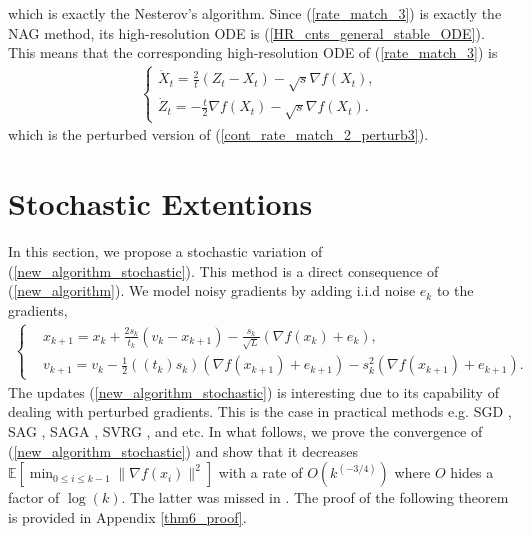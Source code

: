 \documentclass{article}
\theoremstyle{plain}
\theoremstyle{definition}
\theoremstyle{remark}
\begin{document}
which is exactly the Nesterov's algorithm. Since (\ref{rate_match_3}) is exactly the NAG method, its high-resolution ODE is (\ref{HR_cnts_general_stable_ODE}). This means that the corresponding high-resolution ODE of (\ref{rate_match_3}) is 
\begin{align}\label{cont_rate_match_2_perturb4}
    \left\{\begin{array}{l}
         \dot X_t = \frac{2}{t}(Z_t-X_t)-\sqrt{s}\nabla f(X_t),  \\
          \dot Z_t = -\frac{t}{2}\nabla f(X_t)-\sqrt{s}\nabla f(X_t).
    \end{array}
    \right.
\end{align}
which is the perturbed version of (\ref{cont_rate_match_2_perturb3}).

\section{Stochastic Extentions}\label{section5}
In this section, we propose a stochastic variation of (\ref{new_algorithm_stochastic}). This method is a direct consequence of (\ref{new_algorithm}). We model noisy gradients by adding i.i.d noise $e_k$ to the gradients, 
\begin{align}\label{new_algorithm_stochastic}
   \left\{ \begin{array}{ll}
    &x_{k+1}   =    x_{k} + \frac{2s_k}{t_k}(v_k-x_{k+1})-\frac{s_k}{\sqrt{L}}(\nabla f(x_k)+e_k),\\
     &v_{k+1}    = v_k -\tfrac{1}{2}((t_k)s_k)(\nabla f(x_{k+1})+e_{k+1})-s_k^2(\nabla f(x_{k+1})+e_{k+1}). 
    \end{array}\right.
\end{align}
The updates (\ref{new_algorithm_stochastic}) is interesting due to its capability of dealing with perturbed gradients. This is the case in practical methods e.g. SGD \citep{bottou2010large}, SAG \citep{schmidt2017minimizing}, SAGA \citep{defazio2014saga}, SVRG \citep{johnson2013accelerating}, and etc.
In what follows, we prove the convergence of (\ref{new_algorithm_stochastic}) and show that it decreases $\mathbb E\left[\min_{0\leq i\leq k-1}\|\nabla f(x_i)\|^2 \right]$ with a rate of $O(k^{(-3/4)})$ where $O$ hides a factor of $\log(k)$. The latter was missed in \citep{pmlr-v108-laborde20a}. The proof of the following theorem is provided in Appendix \ref{thm6_proof}.
\end{document}
